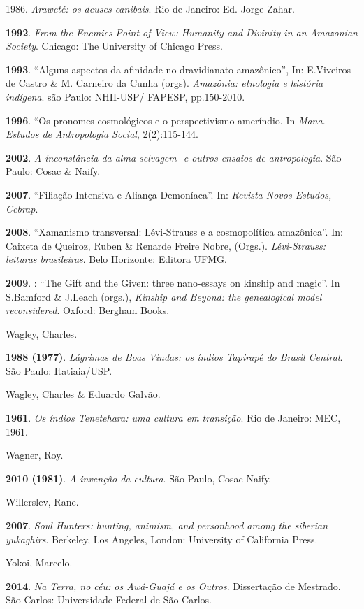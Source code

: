 1986. \emph{Araweté: os deuses canibais}. Rio de Janeiro: Ed. Jorge
Zahar.

\textbf{1992}. \emph{From the Enemies Point of View: Humanity and
Divinity in an Amazonian Society}. Chicago: The University of Chicago
Press.

\textbf{1993}. ``Alguns aspectos da afinidade no dravidianato amazônico'',
In: E.Viveiros de Castro \& M. Carneiro da Cunha (orgs). \emph{Amazônia:
etnologia e história indígena}. são Paulo: NHII-USP/ FAPESP,
pp.150-2010.

\textbf{1996}. ``Os pronomes cosmológicos e o perspectivismo ameríndio.
In \emph{Mana}. \emph{Estudos de Antropologia Social}, 2(2):115-144.

\textbf{2002}. \emph{A inconstância da alma selvagem- e outros ensaios
de antropologia}. São Paulo: Cosac \& Naify.

\textbf{2007}. ``Filiação Intensiva e Aliança Demoníaca''. In:
\emph{Revista Novos Estudos, Cebrap}.

\textbf{2008}. ``Xamanismo transversal: Lévi-Strauss e a cosmopolítica
amazônica''. In: Caixeta de Queiroz, Ruben \& Renarde Freire Nobre,
(Orgs.). \emph{Lévi-Strauss: leituras brasileiras}. Belo Horizonte:
Editora UFMG.

\textbf{2009}. : ``The Gift and the Given: three nano-essays on kinship
and magic''. In S.Bamford \& J.Leach (orgs.), \emph{Kinship and Beyond:
the genealogical model reconsidered}. Oxford: Bergham Books.

Wagley, Charles.

\textbf{1988 (1977)}. \emph{Lágrimas de Boas Vindas: os índios Tapirapé
do Brasil Central}. São Paulo: Itatiaia/USP.

Wagley, Charles \& Eduardo Galvão.

\textbf{1961}. \emph{Os índios Tenetehara: uma cultura em transição}.
Rio de Janeiro: MEC, 1961.

Wagner, Roy.

\textbf{2010 (1981)}. \emph{A invenção da cultura}. São Paulo, Cosac
Naify.

Willerslev, Rane.

\textbf{2007}. \emph{Soul Hunters: hunting, animism, and personhood
among the siberian yukaghirs}. Berkeley, Los Angeles, London: University
of California Press.

Yokoi, Marcelo.

\textbf{2014}. \emph{Na Terra, no céu: os Awá-Guajá e os Outros}.
Dissertação de Mestrado. São Carlos: Universidade Federal de São Carlos.

